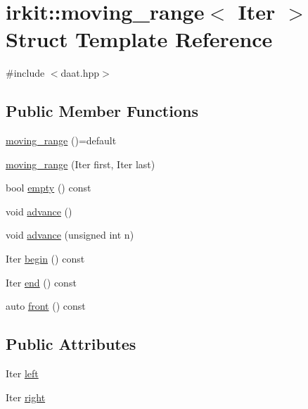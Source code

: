 \hypertarget{structirkit_1_1moving__range}{}\section{irkit\+:\+:moving\+\_\+range$<$ Iter $>$ Struct Template Reference}
\label{structirkit_1_1moving__range}


{\ttfamily \#include $<$daat.\+hpp$>$}

\subsection*{Public Member Functions}
\begin{DoxyCompactItemize}
\item 
\hyperlink{structirkit_1_1moving__range_a9b6d474c670875034ca5a044b0a2fc14}{moving\+\_\+range} ()=default
\item 
\hyperlink{structirkit_1_1moving__range_a79a261cc6e7da7ffb0d93a198fe3dab7}{moving\+\_\+range} (Iter first, Iter last)
\item 
bool \hyperlink{structirkit_1_1moving__range_a8d4e48c5d31fbc158da77eec0c90010e}{empty} () const
\item 
void \hyperlink{structirkit_1_1moving__range_a5ee65e31d2983395c02b724ede47c034}{advance} ()
\item 
void \hyperlink{structirkit_1_1moving__range_a792efd70f3efcb651bff438a0e0814ce}{advance} (unsigned int n)
\item 
Iter \hyperlink{structirkit_1_1moving__range_af58c3dbe1e87c3222ee4a80aa745d9a1}{begin} () const
\item 
Iter \hyperlink{structirkit_1_1moving__range_a5e5ff06f38d6cdba4735e7dd632759ef}{end} () const
\item 
auto \hyperlink{structirkit_1_1moving__range_ad9b6b752c32f19fdbfe2dfa607ea4fc3}{front} () const
\end{DoxyCompactItemize}
\subsection*{Public Attributes}
\begin{DoxyCompactItemize}
\item 
Iter \hyperlink{structirkit_1_1moving__range_a175a0bc6996715ea27e6b87abff03139}{left}
\item 
Iter \hyperlink{structirkit_1_1moving__range_aa64b16b98bdd7b627ecceb82c8ef3bec}{right}
\end{DoxyCompactItemize}


